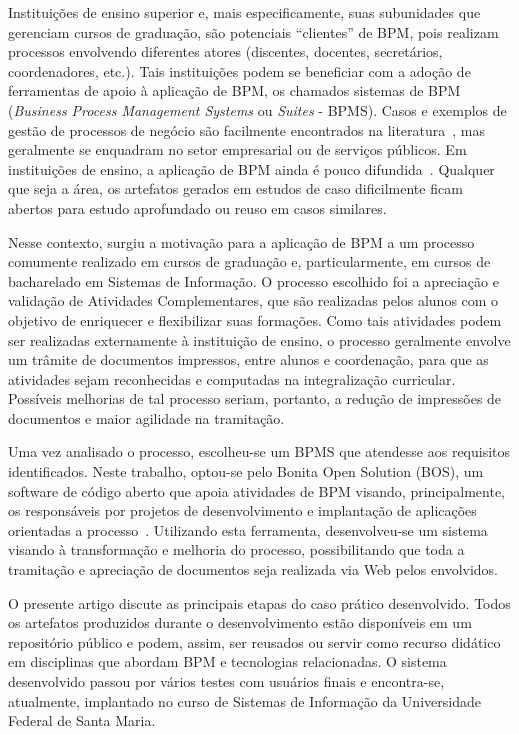 \documentclass[12pt]{article}
\begin{document}
Instituições de ensino superior e, mais especificamente, suas subunidades que gerenciam cursos de graduação, são potenciais “clientes” de BPM, pois realizam processos envolvendo diferentes atores (discentes, docentes, secretários, coordenadores, etc.). Tais instituições podem se beneficiar com a adoção de ferramentas de apoio à aplicação de BPM, os chamados sistemas de BPM (\emph{Business Process Management Systems} ou \emph{Suites} - BPMS). Casos e exemplos de gestão de processos de negócio são facilmente encontrados na literatura~\cite{JestonNelis2012}, mas geralmente se enquadram no setor empresarial ou de serviços públicos. Em instituições de ensino, a aplicação de BPM ainda é pouco difundida~\cite{samia2010}. Qualquer que seja a área, os artefatos gerados em estudos de caso dificilmente ficam abertos para estudo aprofundado ou reuso em casos similares.

Nesse contexto, surgiu a motivação para a aplicação de BPM a um processo comumente realizado em cursos de graduação e, particularmente, em cursos de bacharelado em Sistemas de Informação.
O processo escolhido foi a apreciação e validação de Atividades Complementares, que são realizadas pelos alunos com o objetivo de enriquecer e flexibilizar suas formações. Como tais atividades podem ser realizadas externamente à instituição de ensino, o processo geralmente envolve um trâmite de documentos impressos, entre alunos e coordenação, para que as atividades sejam reconhecidas e computadas na integralização curricular. Possíveis melhorias de tal processo seriam, portanto, a redução de impressões de documentos e maior agilidade na tramitação.

Uma vez analisado o processo, escolheu-se um BPMS que atendesse aos requisitos identificados. Neste trabalho, optou-se pelo Bonita Open Solution (BOS), um software de código aberto que apoia atividades de BPM visando, principalmente, os responsáveis  por projetos de desenvolvimento e implantação de aplicações orientadas a processo~\cite{BONITASOFT}. Utilizando esta ferramenta, desenvolveu-se um sistema visando à transformação e melhoria do processo, possibilitando que toda a tramitação e apreciação de documentos seja realizada via Web pelos envolvidos.

O presente artigo discute as principais etapas do caso prático desenvolvido. Todos os artefatos produzidos durante o desenvolvimento estão disponíveis em um repositório público e podem, assim, ser reusados ou servir como recurso didático em disciplinas que abordam BPM e tecnologias relacionadas. O sistema desenvolvido passou por vários testes com usuários finais e encontra-se, atualmente, implantado no curso de Sistemas de Informação da Universidade Federal de Santa Maria.
\end{document}
